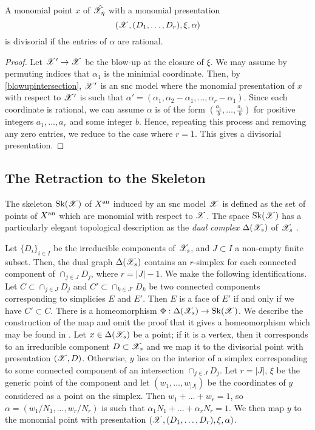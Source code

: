 \begin{prop} \label{monomialisdivisorial} \parencite[Proposition 2.4.11]{MN}
    A monomial point $x$ of $\hat{\mathscr{X}}_{\eta}$ with a monomial presentation \[(\mathscr{X}, (D_1, \dots, D_r), \xi, \alpha)\] is divisorial if the entries of $\alpha$ are rational.
\end{prop}
\begin{proof}
    Let $\mathscr{X}' \to \mathscr{X}$ be the blow-up at the closure of $\xi$.
    We may assume by permuting indices that $\alpha_1$ is the minimial coordinate. Then, by \cref{blowupintersection}, $\mathscr{X}'$ is an snc model where the monomial presentation of $x$ with respect to $\mathscr{X}'$ is such that $\alpha' = (\alpha_1, \alpha_2 - \alpha_1, \dots, \alpha_r - \alpha_1)$.
    Since each coordinate is rational, we can assume $\alpha$ is of the form $\left(\frac{a_1}{b}, \dots, \frac{a_r}{b} \right)$ for positive integers $a_1, \dots, a_r$ and some integer $b$.
    Hence, repeating this process and removing any zero entries, we reduce to the case where $r = 1$.
    This gives a divisorial presentation.
\end{proof}

\subsection{The Retraction to the Skeleton}

The skeleton $\operatorname{Sk}(\mathscr{X})$ of $X^{\text{an}}$ induced by an snc model $\mathscr{X}$ is defined as the set of points of $X^{\text{an}}$ which are monomial with respect to $\mathscr{X}$.
The space $\operatorname{Sk}(\mathscr{X})$ has a particularly elegant topological description as the \textit{dual complex} $\Delta(\mathscr{X}_s)$ of $\mathscr{X}_s$ \parencite[\S 2.4.2]{birgeom}.

Let $\{D_i\}_{i \in I}$ be the irreducible components of $\mathscr{X}_s$, and $J \subset I$ a non-empty finite subset.
Then, the dual graph $\Delta(\mathscr{X}_s)$ contains an $r$-simplex for each connected component of $\cap_{j \in J} D_j$, where $r = |J| - 1$.
We make the following identifications. 
Let $C \subset \cap_{j \in J} D_j$ and $C' \subset \cap_{k \in J'} D_k$ be two connected components corresponding to simplicies $E$ and $E'$. 
Then $E$ is a face of $E'$ if and only if we have $C' \subset C$.
There is a homeomorphism $\Phi: \Delta(\mathscr{X}_s) \to \operatorname{Sk}(\mathscr{X})$.
We describe the construction of the map and omit the proof that it gives a homeomorphism which may be found in \parencite[\S 2.4.4]{birgeom}.
Let $x \in \Delta(\mathscr{X}_s)$ be a point; if it is a vertex, then it corresponds to an irreducible component $D \subset \mathscr{X}_s$ and we map it to the divisorial point with presentation $(\mathscr{X}, D)$.
Otherwise, $y$ lies on the interior of a simplex corresponding to some connected component of an intersection $\cap _{j \in J} D_j$.
Let $r = |J|$, $\xi$ be the generic point of the component and let $(w_1, \dots, w_{|J|})$ be the coordinates of $y$ considered as a point on the simplex.
Then $w_1 + \dots + w_{r} = 1$, so $\alpha = \left({w_1}/{N_1}, \dots, {w_r}/{N_r} \right)$ is such that $\alpha_1 N_1 + \dots + \alpha_r N_r = 1$.
We then map $y$ to the monomial point with presentation $(\mathscr{X}, (D_1, \dots, D_r), \xi, \alpha)$.

